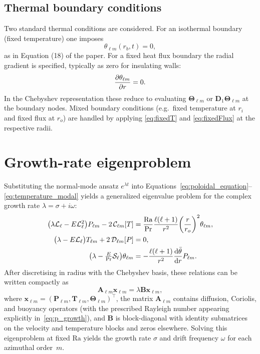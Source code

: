 \documentclass[11pt]{article}
\numberwithin{equation}{section}
\begin{document}
\subsection{Thermal boundary conditions}
Two standard thermal conditions are considered. For an isothermal boundary (fixed temperature) one imposes
\begin{equation}
  \theta_{\ell m}(r_b, t) = 0,
  \label{eq:fixedT}
\end{equation}
as in Equation (18) of the paper. For a fixed heat flux boundary the radial gradient is specified, typically as zero for insulating walls:
\begin{equation}
  \pdv{\theta_{\ell m}}{r}(r_b, t) = 0.
  \label{eq:fixedFlux}
\end{equation}
In the Chebyshev representation these reduce to evaluating $\bm{\Theta}_{\ell m}$ or $\bm{D}_1 \bm{\Theta}_{\ell m}$ at the boundary nodes. Mixed boundary conditions (e.g.\ fixed temperature at $r_i$ and fixed flux at $r_o$) are handled by applying \eqref{eq:fixedT} and \eqref{eq:fixedFlux} at the respective radii.

\section{Growth-rate eigenproblem}
Substituting the normal-mode ansatz $e^{\lambda t}$ into Equations~\eqref{eq:poloidal_equation}--\eqref{eq:temperature_modal} yields a generalized eigenvalue problem for the complex growth rate $\lambda = \sigma + i \omega$:
\begin{align}
  \bigl(\lambda \mathcal{L}_\ell - E \mathcal{L}_\ell^2\bigr) P_{\ell m}
    - 2\,\mathcal{C}_{\ell m}[T]
    &= \frac{\mathrm{Ra}}{\mathrm{Pr}} \frac{\ell(\ell+1)}{r^2} \qty(\frac{r}{r_o})^2 \theta_{\ell m}, \label{eq:p_growth}\\
  \bigl(\lambda - E \mathcal{L}_\ell\bigr) T_{\ell m}
    + 2\,\mathcal{D}_{\ell m}[P]
    &= 0, \label{eq:t_growth}\\
  \bigl(\lambda - \tfrac{E}{\mathrm{Pr}}\mathcal{S}_\ell\bigr) \theta_{\ell m}
    &= -\frac{\ell(\ell+1)}{r^2} \dv{\bar{\theta}}{r} P_{\ell m}. \label{eq:theta_growth}
\end{align}
After discretising in radius with the Chebyshev basis, these relations can be written compactly as
\begin{equation}
  \bm{A}_{\ell m} \bm{x}_{\ell m} = \lambda \bm{B} \bm{x}_{\ell m},
\end{equation}
where $\bm{x}_{\ell m} = (\bm{P}_{\ell m}, \bm{T}_{\ell m}, \bm{\Theta}_{\ell m})^\top$, the matrix $\bm{A}_{\ell m}$ contains diffusion, Coriolis, and buoyancy operators (with the prescribed Rayleigh number appearing explicitly in~\eqref{eq:p_growth}), and $\bm{B}$ is block-diagonal with identity submatrices on the velocity and temperature blocks and zeros elsewhere. Solving this eigenproblem at fixed $\mathrm{Ra}$ yields the growth rate $\sigma$ and drift frequency $\omega$ for each azimuthal order~$m$.
\end{document}
